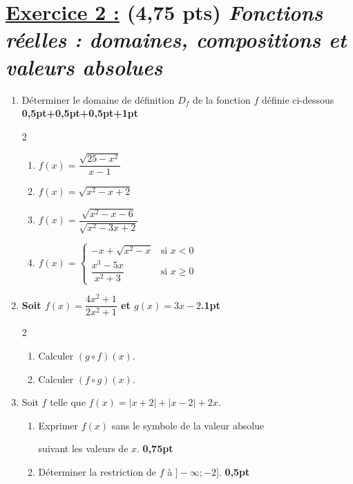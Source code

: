 \documentclass[12pt,a4paper]{article}
\begin{document}
\section*{\underline{ Exercice 2 :} (4,75 pts) \small\itshape Fonctions réelles : domaines, compositions et valeurs absolues}
\begin{enumerate}
\item Déterminer le domaine de définition $D_f$ de la fonction $f$ définie ci-dessous \textbf{0,5pt+0,5pt+0,5pt+1pt}
\begin{multicols}{2}
\setlength{\columnseprule}{0.5mm} %
    \begin{enumerate}
        \item $f(x) = \dfrac{\sqrt{25 - x^2}}{x - 1}$\vspace{0.09cm}
        \item $f(x) = \sqrt{x^2 - x + 2}$ 
        \item $f(x) = \dfrac{\sqrt{x^2 - x - 6}}{\sqrt{x^2 - 3x + 2}}$ 
        \item $f(x) = \begin{cases} 
        -x + \sqrt{x^2 - x} & \text{si } x < 0 \\ 
        \dfrac{x^3 - 5x}{x^2 + 3} & \text{si } x \ge 0 
        \end{cases}$
    \end{enumerate}
\end{multicols}
  \item \textbf{Soit $f(x) = \dfrac{4x^2 + 1}{2x^2 + 1}$ et $g(x) = 3x - 2$.}\hfill \textbf{1pt}
\begin{multicols}{2}
\setlength{\columnseprule}{0.9mm} %
\begin{enumerate}   
    \item Calculer $(g \circ f)(x)$.
    \item Calculer $(f \circ g)(x)$.
\end{enumerate}
\end{multicols}
\item Soit $f$ telle que $f(x) = |x + 2| + |x - 2| + 2x$.

 \begin{enumerate} 
    \item Exprimer $f(x)$ sans le symbole de la valeur absolue 
    
    suivant les valeurs de $x$. \hfill \textbf{0,75pt} 
    \item Déterminer la restriction de $f$ à $]-\infty ; -2]$. \hfill \textbf{0,5pt} \\
\end{enumerate}

\end{enumerate}
\vspace{3cm}
\end{document}
